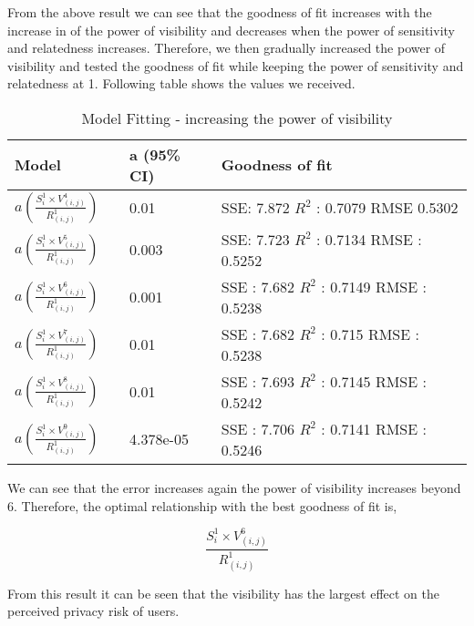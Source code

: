 \documentclass[10pt]{article}
\begin{document}
From the above result we can see that the goodness of fit increases with the increase in of the power of visibility and decreases when the power of sensitivity and relatedness increases. Therefore, we then gradually increased the power of visibility and tested the goodness of fit while keeping the power of sensitivity and relatedness at 1. Following table shows the values we received.
\begin{center}
\begin{table}[htbp]
\caption{Model Fitting - increasing the power of visibility}
\begin{center}
\begin{adjustbox}{width=0.5\textwidth} 
\begin{tabular}{|p{0.25\linewidth}|p{0.2\linewidth}|p{0.55\linewidth}|} 
\hline
Model & a (95\% CI) & Goodness of fit\\
\hline
 $a(  \frac{S_{i}^1 \times V_{(i,j)}^4}{R_{(i,j)}^1})$ & 0.01 &  SSE: 7.872   $R^2$ : 0.7079  RMSE 0.5302\\
\hline
 $a(  \frac{S_{i}^1 \times V_{(i,j)}^5}{R_{(i,j)}^1}) $ & 0.003 & SSE: 7.723 $R^2$ : 0.7134  RMSE : 0.5252 \\
\hline
$a(  \frac{S_{i}^1 \times V_{(i,j)}^6}{R_{(i,j)}^1})$ & 0.001 & SSE : 7.682  $R^2$ : 0.7149  RMSE : 0.5238 \\
\hline
$a(  \frac{S_{i}^1 \times V_{(i,j)}^7}{R_{(i,j)}^1})$ & 0.01 &   SSE : 7.682  $R^2$ : 0.715  RMSE : 0.5238 \\
\hline
$a(  \frac{S_{i}^1 \times V_{(i,j)}^8}{R_{(i,j)}^1})$ & 0.01 & SSE : 7.693  $R^2$ : 0.7145  RMSE : 0.5242 \\
\hline
$a(  \frac{S_{i}^1 \times V_{(i,j)}^9}{R_{(i,j)}^1})$ & 4.378e-05  & SSE : 7.706  $R^2$  : 0.7141  RMSE : 0.5246 \\
\hline
\end{tabular}
\end{adjustbox}
\end{center}
\end{table}
\end{center}

We can see that the error increases again the power of visibility increases beyond 6. Therefore, the optimal relationship with the best goodness of fit is,

\[
\frac{S_{i}^1 \times V_{(i,j)}^6}{R_{(i,j)}^1}
\]

From this result it can be seen that the visibility has the largest effect on the perceived privacy risk of users. 
\end{document}
